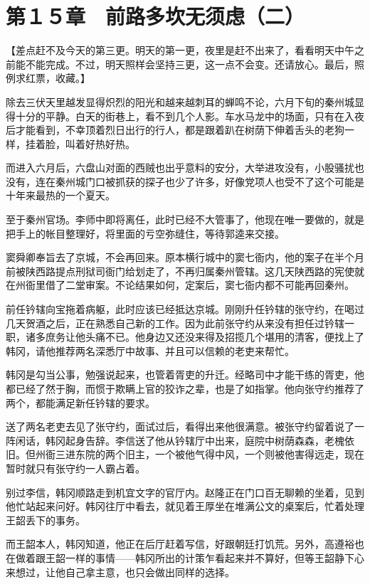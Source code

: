 \section{第１５章　前路多坎无须虑（二）}

【差点赶不及今天的第三更。明天的第一更，夜里是赶不出来了，看看明天中午之前能不能完成。不过，明天照样会坚持三更，这一点不会变。还请放心。最后，照例求红票，收藏。】

除去三伏天里越发显得炽烈的阳光和越来越刺耳的蝉鸣不论，六月下旬的秦州城显得十分的平静。白天的街巷上，看不到几个人影。车水马龙中的场面，只有在入夜后才能看到，不幸顶着烈日出行的行人，都是跟着趴在树荫下伸着舌头的老狗一样，挂着脸，叫着好热好热。

而进入六月后，六盘山对面的西贼也出乎意料的安分，大举进攻没有，小股骚扰也没有，连在秦州城门口被抓获的探子也少了许多，好像党项人也受不了这个可能是十年来最热的一个夏天。

至于秦州官场。李师中即将离任，此时已经不大管事了，他现在唯一要做的，就是把手上的帐目整理好，将里面的亏空弥缝住，等待郭逵来交接。

窦舜卿奉旨去了京城，不会再回来。原本横行城中的窦七衙内，他的案子在半个月前被陕西路提点刑狱司衙门给划走了，不再归属秦州管辖。这几天陕西路的宪使就在州衙里借了二堂审案。不论结果如何，定案后，窦七衙内都不可能再回秦州。

前任钤辖向宝拖着病躯，此时应该已经抵达京城。刚刚升任钤辖的张守约，在喝过几天贺酒之后，正在熟悉自己新的工作。因为此前张守约从来没有担任过钤辖一职，诸多庶务让他头痛不已。他身边又还没来得及招揽几个堪用的清客，便找上了韩冈，请他推荐两名深悉厅中故事、并且可以信赖的老吏来帮忙。

韩冈是勾当公事，勉强说起来，也管着胥吏的升迁。经略司中才能干练的胥吏，他都已经了然于胸，而惯于欺瞒上官的狡诈之辈，也是了如指掌。他向张守约推荐了两个，都能满足新任钤辖的要求。

送了两名老吏去见了张守约，面试过后，看得出来他很满意。被张守约留着说了一阵闲话，韩冈起身告辞。李信送了他从钤辖厅中出来，庭院中树荫森森，老槐依旧。但州衙三进东院的两个旧主，一个被他气得中风，一个则被他害得远走，现在暂时就只有张守约一人霸占着。

别过李信，韩冈顺路走到机宜文字的官厅内。赵隆正在门口百无聊赖的坐着，见到他忙站起来问好。韩冈往厅中看去，就见着王厚坐在堆满公文的桌案后，忙着处理王韶丢下的事务。

而王韶本人，韩冈知道，他正在后厅赶着写信，好跟朝廷打饥荒。另外，高遵裕也在做着跟王韶一样的事情——韩冈所出的计策乍看起来并不算好，但等王韶静下心来想过，让他自己拿主意，也只会做出同样的选择。

